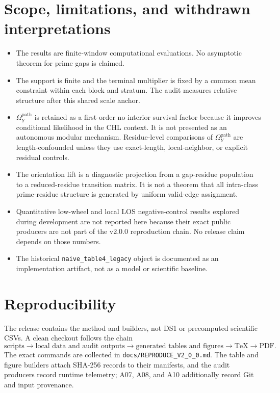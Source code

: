 \documentclass[10pt]{article}
\begin{document}
\section{Scope, limitations, and withdrawn interpretations}\label{sec:limitations}
\begin{itemize}
\item The results are finite-window computational evaluations.  No asymptotic theorem for prime gaps is claimed.
\item The support is finite and the terminal multiplier is fixed by a common mean constraint within each block and stratum.  The audit measures relative structure after this shared scale anchor.
\item $\Omega_Y^{\mathrm{path}}$ is retained as a first-order no-interior survival factor because it improves conditional likelihood in the CHL context.  It is not presented as an autonomous modular mechanism.  Residue-level comparisons of $\Omega_Y^{\mathrm{path}}$ are length-confounded unless they use exact-length, local-neighbor, or explicit residual controls.
\item The orientation lift is a diagnostic projection from a gap-residue population to a reduced-residue transition matrix.  It is not a theorem that all intra-class prime-residue structure is generated by uniform valid-edge assignment.
\item Quantitative low-wheel and local LOS negative-control results explored during development are not reported here because their exact public producers are not part of the v2.0.0 reproduction chain.  No release claim depends on those numbers.
\item The historical \texttt{naive\_table4\_legacy} object is documented as an implementation artifact, not as a model or scientific baseline.
\end{itemize}

\section{Reproducibility}\label{sec:reproducibility}
The release contains the method and builders, not DS1 or precomputed scientific CSVs.  A clean checkout follows the chain
\[
\text{scripts}
\longrightarrow
\text{local data and audit outputs}
\longrightarrow
\text{generated tables and figures}
\longrightarrow
\text{TeX}
\longrightarrow
\text{PDF}.
\]
The exact commands are collected in \texttt{docs/REPRODUCE\_V2\_0\_0.md}.  The table and figure builders attach SHA-256 records to their manifests, and the audit producers record runtime telemetry; A07, A08, and A10 additionally record Git and input provenance.
\end{document}
